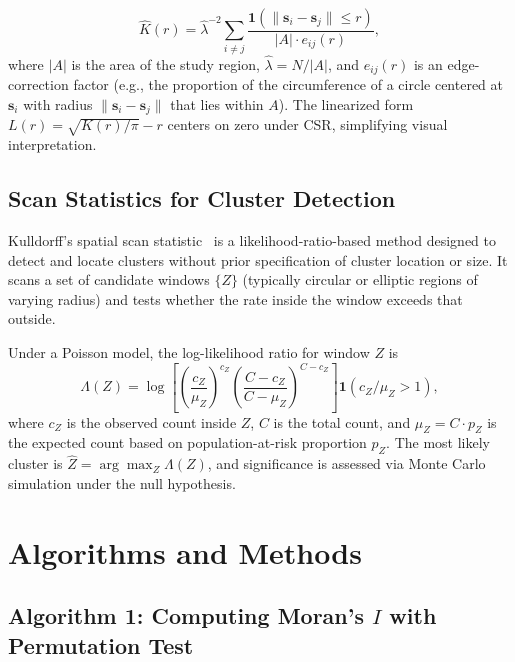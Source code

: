 \documentclass[conference]{IEEEtran}
\theoremstyle{definition}
\begin{document}
\begin{equation}
\hat{K}(r) = \hat{\lambda}^{-2} \sum_{i \neq j} \frac{\mathbf{1}(\|\mathbf{s}_i - \mathbf{s}_j\| \leq r)}{|A| \cdot e_{ij}(r)},
\label{eq:K_estimator}
\end{equation}
where $|A|$ is the area of the study region, $\hat{\lambda} = N/|A|$, and $e_{ij}(r)$ is an edge-correction factor (e.g., the proportion of the circumference of a circle centered at $\mathbf{s}_i$ with radius $\|\mathbf{s}_i - \mathbf{s}_j\|$ that lies within $A$). The linearized form $L(r) = \sqrt{K(r)/\pi} - r$ centers on zero under CSR, simplifying visual interpretation.

\subsection{Scan Statistics for Cluster Detection}

Kulldorff's spatial scan statistic~\cite{kulldorff1997} is a likelihood-ratio-based method designed to detect and locate clusters without prior specification of cluster location or size. It scans a set of candidate windows $\{Z\}$ (typically circular or elliptic regions of varying radius) and tests whether the rate inside the window exceeds that outside.

Under a Poisson model, the log-likelihood ratio for window $Z$ is
\begin{equation}
\Lambda(Z) = \log\left[\left(\frac{c_Z}{\mu_Z}\right)^{c_Z}\left(\frac{C - c_Z}{C - \mu_Z}\right)^{C - c_Z}\right] \mathbf{1}(c_Z/\mu_Z > 1),
\label{eq:kulldorff}
\end{equation}
where $c_Z$ is the observed count inside $Z$, $C$ is the total count, and $\mu_Z = C \cdot p_Z$ is the expected count based on population-at-risk proportion $p_Z$. The most likely cluster is $\hat{Z} = \arg\max_Z \Lambda(Z)$, and significance is assessed via Monte Carlo simulation under the null hypothesis.

\section{Algorithms and Methods}
\label{sec:algorithms}

\subsection{Algorithm 1: Computing Moran's $I$ with Permutation Test}
\end{document}
